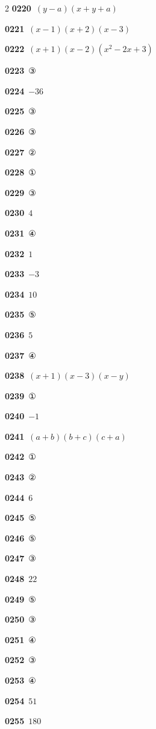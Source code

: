\documentclass[10pt,a4paper]{article}
\begin{document}
\begin{multicols}{2}
\noindent\textbf{0220}\ $(y-a)(x+y+a)$\par
\noindent\textbf{0221}\ $(x-1)(x+2)(x-3)$\par
\noindent\textbf{0222}\ $(x+1)(x-2)(x^2-2x+3)$\par
\noindent\textbf{0223}\ ③\par
\noindent\textbf{0224}\ $-36$\par
\noindent\textbf{0225}\ ③\par
\noindent\textbf{0226}\ ③\par
\noindent\textbf{0227}\ ②\par
\noindent\textbf{0228}\ ①\par
\noindent\textbf{0229}\ ③\par
\noindent\textbf{0230}\ $4$\par
\noindent\textbf{0231}\ ④\par
\noindent\textbf{0232}\ $1$\par
\noindent\textbf{0233}\ $-3$\par
\noindent\textbf{0234}\ $10$\par
\noindent\textbf{0235}\ ⑤\par
\noindent\textbf{0236}\ $5$\par
\noindent\textbf{0237}\ ④\par
\noindent\textbf{0238}\ $(x+1)(x-3)(x-y)$\par
\noindent\textbf{0239}\ ①\par
\noindent\textbf{0240}\ $-1$\par
\noindent\textbf{0241}\ $(a+b)(b+c)(c+a)$\par
\noindent\textbf{0242}\ ①\par
\noindent\textbf{0243}\ ②\par
\noindent\textbf{0244}\ $6$\par
\noindent\textbf{0245}\ ⑤\par
\noindent\textbf{0246}\ ⑤\par
\noindent\textbf{0247}\ ③\par
\noindent\textbf{0248}\ $22$\par
\noindent\textbf{0249}\ ⑤\par
\noindent\textbf{0250}\ ③\par
\noindent\textbf{0251}\ ④\par
\noindent\textbf{0252}\ ③\par
\noindent\textbf{0253}\ ④\par
\noindent\textbf{0254}\ $51$\par
\noindent\textbf{0255}\ $180$\par

\end{multicols}
\end{document}
